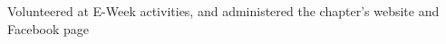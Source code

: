 \begin{service}
  \begin{servicedescription}
    Volunteered at E-Week activities, and administered the chapter's website and
    Facebook page
  \end{servicedescription}
\end{service}
